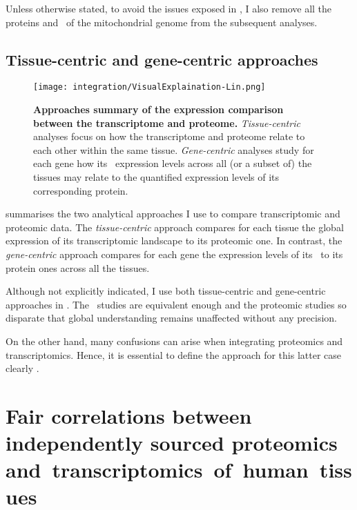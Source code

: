 Unless otherwise stated, to avoid the issues exposed in ,
I also remove all the proteins and \mRNAs\ of the mitochondrial genome
from the subsequent analyses.

\vspace{-3mm}
\subsection{Tissue-centric and gene-centric approaches}
\vspace{-3mm}
\begin{figure}[!htb]
    \texttt{[image: integration/VisualExplaination-Lin.png]}\centering
    \vspace{-3mm}
    \caption[Summary of the expression comparison approaches between
    the transcriptome and proteome]{\label{fig:visualexp}\textbf{Approaches
    summary of the expression comparison between the transcriptome and proteome.}
    \emph{Tissue-centric} analyses focus on
    how the transcriptome and proteome relate to each other within the same tissue.
    \emph{Gene-centric} analyses study for each gene how its \mRNA\ expression
    levels across all (or a subset of) the tissues may relate to
    the quantified expression levels of its corresponding protein.
    }
\end{figure}

 summarises the two analytical approaches I use
to compare transcriptomic and proteomic data.
The \emph{tissue-centric} approach compares for each tissue
the global expression of its transcriptomic landscape to its proteomic one.
In contrast,
the \emph{gene-centric} approach compares for each gene
the expression levels of its \mRNA\ to its protein ones across all the tissues.

Although not explicitly indicated,
I use both tissue-centric and gene-centric approaches
in .
The \mRNAs\ studies are equivalent enough and
the proteomic studies so disparate that
global understanding remains unaffected without any precision.

On the other hand, many confusions can arise
when integrating proteomics and transcriptomics.
Hence, it is essential
to define the approach for this latter case clearly .

\section{Fair correlations between independently sourced proteomics~%
and~transcriptomics~of~human~tissues~}\label{subsec:IntegrationGoodCorrProtTrans}

